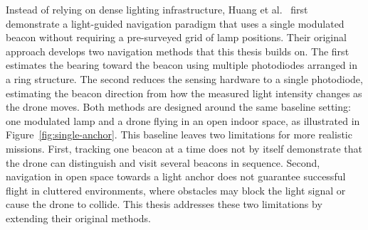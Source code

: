 Instead of relying on dense lighting infrastructure, Huang et al.~\cite{huang2026lta} first demonstrate a light-guided navigation paradigm that uses a single modulated beacon without requiring a pre-surveyed grid of lamp positions. Their original approach develops two navigation methods that this thesis builds on. The first estimates the bearing toward the beacon using multiple photodiodes arranged in a ring structure. The second reduces the sensing hardware to a single photodiode, estimating the beacon direction from how the measured light intensity changes as the drone moves. Both methods are designed around the same baseline setting: one modulated lamp and a drone flying in an open indoor space, as illustrated in Figure~\ref{fig:single-anchor}. This baseline leaves two limitations for more realistic missions. First, tracking one beacon at a time does not by itself demonstrate that the drone can distinguish and visit several beacons in sequence. Second, navigation in open space towards a light anchor does not guarantee successful flight in cluttered environments, where obstacles may block the light signal or cause the drone to collide. This thesis addresses these two limitations by extending their original methods.

